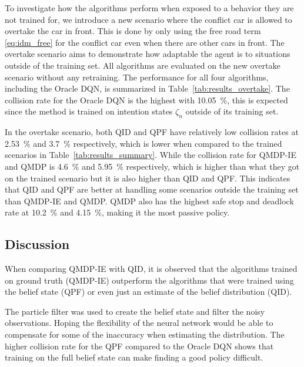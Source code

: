 To investigate how the algorithms perform when exposed to a behavior they are not trained for, we introduce a new scenario where the conflict car is allowed to overtake the car in front. This is done by only using the free road term \eqref{eq:idm_free} for the conflict car even when there are other cars in front. The overtake scenario aims to demonstrate how adaptable the agent is to situations outside of the training set.
All algorithms are evaluated on the new overtake scenario without any retraining. 
The performance for all four algorithms, including the Oracle DQN, is summarized in Table~\ref{tab:results_overtake}. 
The collision rate for the Oracle DQN is the highest with \SI{10.05}{\percent}, this is expected since the method is trained on intention states $\zeta_n$ outside of its training set. 

In the overtake scenario, both QID and QPF have relatively low collision rates at \SI{2.53}{\percent} and \SI{3.7}{\percent} respectively, which is lower when compared to the trained scenarios in Table~\ref{tab:results_summary}. 
While the collision rate for QMDP-IE and QMDP is \SI{4.6}{\percent} and \SI{5.95}{\percent} respectively, which is higher than what they got on the trained scenario but it is also higher than QID and QPF. This indicates that QID and QPF are better at handling some scenarios outside the training set than QMDP-IE and QMDP.
QMDP also has the highest safe stop and deadlock rate at \SI{10.2}{\percent} and \SI{4.15}{\percent}, making it the most passive policy. 

\subsection{Discussion}
\label{sec:discussion}

When comparing QMDP-IE with QID, it is observed that the algorithms trained on ground truth (QMDP-IE) outperform the algorithms that were trained using the belief state (QPF) or even just an estimate of the belief distribution (QID).  

The particle filter was used to create the belief state and filter the noisy observations. Hoping the flexibility of the neural network would be able to compensate for some of the inaccuracy when estimating the distribution. The higher collision rate for the QPF compared to the Oracle DQN shows that training on the full belief state can make finding a good policy difficult. 

